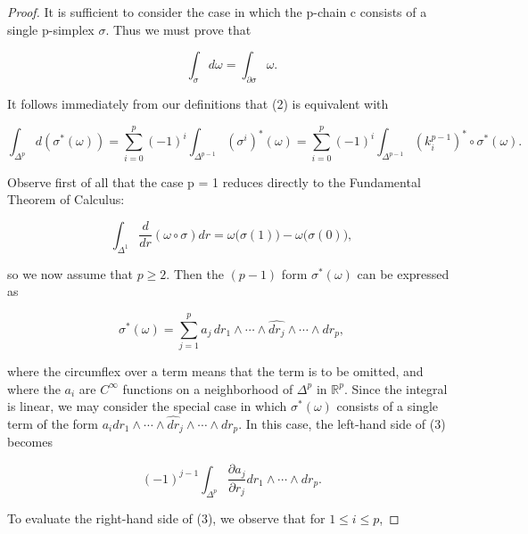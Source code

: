 \begin{proof}
It is sufficient to consider the case in which the p-chain c consists of a single p-simplex  $ \sigma $. Thus we must prove that

\begin{equation}
\tag{2}\label{eq:4.7:2}
\int_{\sigma}d\omega=\int_{\partial\sigma}\omega.
\end{equation}

It follows immediately from our definitions that (2) is equivalent with

\begin{equation}
\tag{3}\label{eq:4.7:3}
\int_{\Delta^{p}}d\left(\sigma^{*}(\omega)\right)=\sum_{i=0}^{p}(-1)^{i}\int_{\Delta^{p-1}}(\sigma^{i})^{*}(\omega)=\sum_{i=0}^{p}(-1)^{i}\int_{\Delta^{p-1}}(k_{i}^{p-1})^{*}\circ\sigma^{*}(\omega).
\end{equation}

Observe first of all that the case p = 1 reduces directly to the Fundamental Theorem of Calculus:

\begin{equation}
\tag{4}\label{eq:4.7:4}
\int_{\Delta^{1}}\frac{d}{d r}(\omega\circ\sigma)d r=\omega\big(\sigma(1)\big)-\omega\big(\sigma(0)\big),
\end{equation}

so we now assume that  $ p \geq 2 $. Then the  $ (p - 1) $ form  $ \sigma^{*}(\omega) $ can be expressed as

\begin{equation}
\tag{5}\label{eq:4.7:5}
\sigma^{*}(\omega)=\sum_{j=1}^{p}a_{j}\,dr_{1}\wedge\cdots\wedge\widehat{dr_{j}}\wedge\cdots\wedge dr_{p},
\end{equation}

where the circumflex over a term means that the term is to be omitted, and where the $a_i$ are $C^\infty$ functions on a neighborhood of $\Delta^p$ in $\mathbb{R}^p$. Since the integral is linear, we may consider the special case in which $\sigma^{*}(\omega)$ consists of a single term of the form $a_i dr_1 \wedge \cdots \wedge \widehat{dr}_j \wedge \cdots \wedge dr_p$. In this case, the left-hand side of (3) becomes

\begin{equation}
\tag{6}\label{eq:4.7:6}
(-1)^{j-1}\int_{\Delta^{p}}\frac{\partial a_{j}}{\partial r_{j}}d r_{1}\wedge\cdots\wedge d r_{p}.
\end{equation}

To evaluate the right-hand side of (3), we observe that for  $ 1 \leq i \leq p $,


\end{proof}
